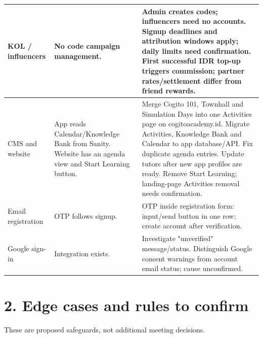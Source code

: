 \documentclass[11pt,a4paper]{article}
\begin{document}
{\begin{longtable}{|L{28.54mm}|L{52.57mm}|L{69.09mm}|}
KOL /\allowbreak{} influencers & No code campaign management. & Admin creates codes; influencers need no accounts. Signup deadlines and attribution windows apply; daily limits need confirmation. First successful IDR top-up triggers commission; partner rates/\allowbreak{}settlement differ from friend rewards. \\ \hline
CMS and website & App reads Calendar/\allowbreak{}Knowledge Bank from Sanity. Website has an agenda view and Start Learning button. & Merge Cogito 101, Townhall and Simulation Days into one Activities page on cogitoacademy.id. Migrate Activities, Knowledge Bank and Calendar to app database/\allowbreak{}API. Fix duplicate agenda entries. Update tutors after new app profiles are ready. Remove Start Learning; landing-page Activities removal needs confirmation. \\ \hline
Email registration & OTP follows signup. & OTP inside registration form: input/\allowbreak{}send button in one row; create account after verification. \\ \hline
Google sign-in & Integration exists. & Investigate "unverified" message/\allowbreak{}status. Distinguish Google consent warnings from account email status; cause unconfirmed. \\ \hline
\end{longtable}
}

\section*{2. Edge cases and rules to confirm}

These are proposed safeguards, not additional meeting decisions.
\end{document}
